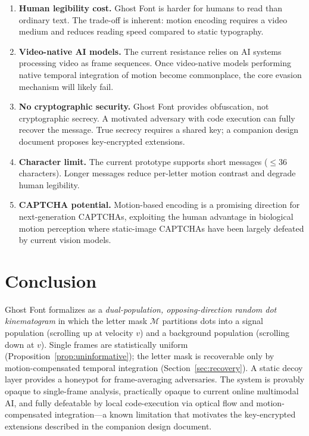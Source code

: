 \documentclass[12pt,a4paper]{article}
\begin{document}
\begin{enumerate}[label=\arabic*.]
  \item \textbf{Human legibility cost.}  Ghost Font is harder for humans to
    read than ordinary text.  The trade-off is inherent: motion encoding
    requires a video medium and reduces reading speed compared to static
    typography.

  \item \textbf{Video-native AI models.}  The current resistance relies on AI
    systems processing video as frame sequences.  Once video-native models
    performing native temporal integration of motion become commonplace, the
    core evasion mechanism will likely fail.

  \item \textbf{No cryptographic security.}  Ghost Font provides obfuscation,
    not cryptographic secrecy.  A motivated adversary with code execution can
    fully recover the message.  True secrecy requires a shared key; a
    companion design document proposes key-encrypted extensions.

  \item \textbf{Character limit.}  The current prototype supports short
    messages ($\leq 36$ characters).  Longer messages reduce per-letter
    motion contrast and degrade human legibility.

  \item \textbf{CAPTCHA potential.}  Motion-based encoding is a promising
    direction for next-generation CAPTCHAs, exploiting the human advantage in
    biological motion perception where static-image CAPTCHAs have been largely
    defeated by current vision models.
\end{enumerate}

\section{Conclusion}

Ghost Font formalizes as a \emph{dual-population, opposing-direction random
dot kinematogram} in which the letter mask $\mathcal{M}$ partitions dots into
a signal population (scrolling up at velocity $v$) and a background population
(scrolling down at $v$).  Single frames are statistically uniform
(Proposition~\ref{prop:uninformative}); the letter mask is recoverable only
by motion-compensated temporal integration (Section~\ref{sec:recovery}).  A
static decoy layer provides a honeypot for frame-averaging adversaries.  The
system is provably opaque to single-frame analysis, practically opaque to
current online multimodal AI, and fully defeatable by local code-execution via
optical flow and motion-compensated integration—a known limitation that
motivates the key-encrypted extensions described in the companion design
document.
\end{document}
